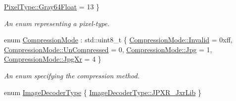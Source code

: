 \begin{DoxyCompactItemize}
\hyperlink{namespacelib_c_z_i_abf8ce12ab88b06c8b3b47efbb5e2e834a6430601b36b882d0c9d97bfdd83865d9}{Pixel\+Type\+::\+Gray64\+Float} = 13
 \}\begin{DoxyCompactList}\small\item\em An enum representing a pixel-\/type. \end{DoxyCompactList}
\item 
enum \hyperlink{namespacelib_c_z_i_a672959aa909ce27c5a549465200b08fb}{Compression\+Mode} \+: std\+::uint8\+\_\+t \{ \hyperlink{namespacelib_c_z_i_a672959aa909ce27c5a549465200b08fba4bbb8f967da6d1a610596d7257179c2b}{Compression\+Mode\+::\+Invalid} = 0xff, 
\hyperlink{namespacelib_c_z_i_a672959aa909ce27c5a549465200b08fbae7e0de5672fc94ea487936c0de3ff199}{Compression\+Mode\+::\+Un\+Compressed} = 0, 
\hyperlink{namespacelib_c_z_i_a672959aa909ce27c5a549465200b08fbad490ed93cc2099a7be4dcb5257fe50bf}{Compression\+Mode\+::\+Jpg} = 1, 
\hyperlink{namespacelib_c_z_i_a672959aa909ce27c5a549465200b08fba92cede94b3f3b5fabbcd19c7fe25b9bc}{Compression\+Mode\+::\+Jpg\+Xr} = 4
 \}\begin{DoxyCompactList}\small\item\em An enum specifying the compression method. \end{DoxyCompactList}
\item 
enum \hyperlink{namespacelib_c_z_i_a68cd7521fd89880f820ea55baf6f6179}{Image\+Decoder\+Type} \{ \hyperlink{namespacelib_c_z_i_a68cd7521fd89880f820ea55baf6f6179a843daf124e8ac9b9d6e02c87c0bdb580}{Image\+Decoder\+Type\+::\+J\+P\+X\+R\+\_\+\+Jxr\+Lib}
 \}
\end{DoxyCompactItemize}

